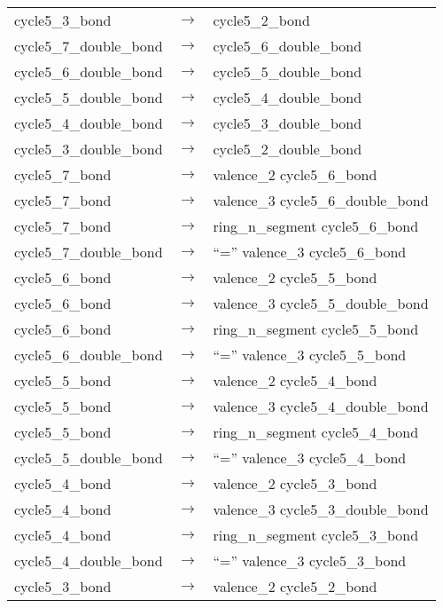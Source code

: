 \documentclass[../Document.tex]{subfiles}
\begin{document}
\begin{longtable}{m{} p{} p{}}
    cycle5\_3\_bond & $\rightarrow$ & cycle5\_2\_bond \\
    cycle5\_7\_double\_bond & $\rightarrow$ & cycle5\_6\_double\_bond \\
    cycle5\_6\_double\_bond & $\rightarrow$ & cycle5\_5\_double\_bond \\
    cycle5\_5\_double\_bond & $\rightarrow$ & cycle5\_4\_double\_bond \\
    cycle5\_4\_double\_bond & $\rightarrow$ & cycle5\_3\_double\_bond \\
    cycle5\_3\_double\_bond & $\rightarrow$ & cycle5\_2\_double\_bond \\
    cycle5\_7\_bond & $\rightarrow$ & valence\_2 cycle5\_6\_bond \\
    cycle5\_7\_bond & $\rightarrow$ & valence\_3 cycle5\_6\_double\_bond \\
    cycle5\_7\_bond & $\rightarrow$ & ring\_n\_segment cycle5\_6\_bond \\
    cycle5\_7\_double\_bond & $\rightarrow$ & ``='' valence\_3 cycle5\_6\_bond \\
    cycle5\_6\_bond & $\rightarrow$ & valence\_2 cycle5\_5\_bond \\
    cycle5\_6\_bond & $\rightarrow$ & valence\_3 cycle5\_5\_double\_bond \\
    cycle5\_6\_bond & $\rightarrow$ & ring\_n\_segment cycle5\_5\_bond \\
    cycle5\_6\_double\_bond & $\rightarrow$ & ``='' valence\_3 cycle5\_5\_bond \\
    cycle5\_5\_bond & $\rightarrow$ & valence\_2 cycle5\_4\_bond \\
    cycle5\_5\_bond & $\rightarrow$ & valence\_3 cycle5\_4\_double\_bond \\
    cycle5\_5\_bond & $\rightarrow$ & ring\_n\_segment cycle5\_4\_bond \\
    cycle5\_5\_double\_bond & $\rightarrow$ & ``='' valence\_3 cycle5\_4\_bond \\
    cycle5\_4\_bond & $\rightarrow$ & valence\_2 cycle5\_3\_bond \\
    cycle5\_4\_bond & $\rightarrow$ & valence\_3 cycle5\_3\_double\_bond \\
    cycle5\_4\_bond & $\rightarrow$ & ring\_n\_segment cycle5\_3\_bond \\
    cycle5\_4\_double\_bond & $\rightarrow$ & ``='' valence\_3 cycle5\_3\_bond \\
    cycle5\_3\_bond & $\rightarrow$ & valence\_2 cycle5\_2\_bond \\

\end{longtable}
\end{document}
